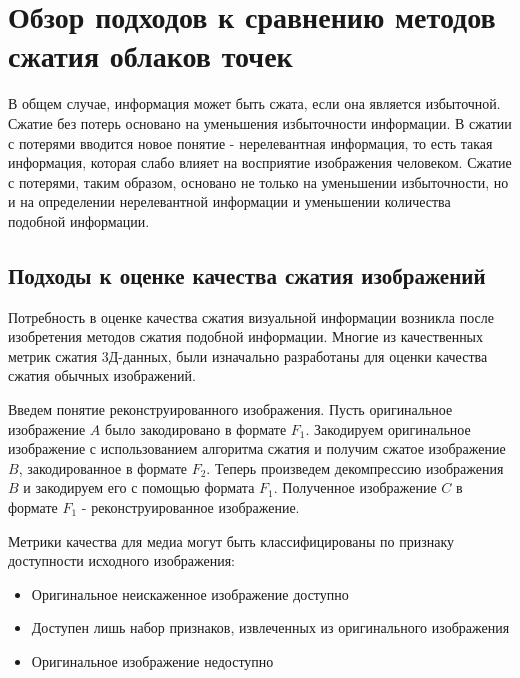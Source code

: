 \newpage
\chapter{Обзор подходов к сравнению методов сжатия облаков точек}


В общем случае, информация может быть сжата, если она является избыточной.
Сжатие без потерь основано на уменьшения избыточности информации. В сжатии с
потерями вводится новое понятие - нерелевантная информация, то есть такая
информация, которая слабо влияет на восприятие изображения человеком. Сжатие с
потерями, таким образом, основано не только на уменьшении избыточности, но и на
определении нерелевантной информации и уменьшении количества подобной
информации\cite[265]{DataCompression}.

\section{Подходы к оценке качества сжатия изображений}


Потребность в оценке качества сжатия визуальной информации возникла после
изобретения методов сжатия подобной информации. Многие из качественных метрик
сжатия 3Д-данных, были изначально разработаны для оценки качества сжатия обычных
изображений.

Введем понятие реконструированного изображения. Пусть оригинальное изображение
$A$ было закодировано в формате $F_{1}$. Закодируем оригинальное изображение с
использованием алгоритма сжатия и получим сжатое изображение $B$, закодированное
в формате $F_{2}$. Теперь произведем декомпрессию изображения $B$ и закодируем
его с помощью формата $F_{1}$. Полученное изображение $C$ в формате $F_{1}$ -
реконструированное изображение.

Метрики качества для медиа могут быть классифицированы по признаку доступности
исходного изображения\cite{SSIMArticle}:

\begin{itemize}
    \item Оригинальное неискаженное изображение доступно
    \item Доступен лишь набор признаков, извлеченных из оригинального изображения
    \item Оригинальное изображение недоступно
\end{itemize}

